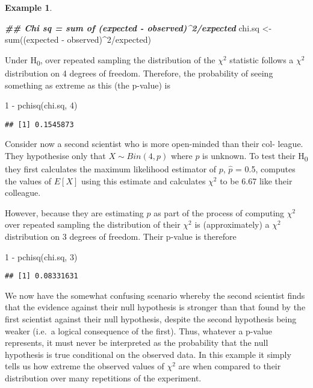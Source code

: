 \documentclass[
]{book}
\newenvironment{Shaded}{\begin{snugshade}}{\end{snugshade}}
\newcommand{\DecValTok}[1]{\textcolor[rgb]{0.00,0.00,0.81}{#1}}
\newcommand{\DocumentationTok}[1]{\textcolor[rgb]{0.56,0.35,0.01}{\textbf{\textit{#1}}}}
\newcommand{\FunctionTok}[1]{\textcolor[rgb]{0.00,0.00,0.00}{#1}}
\newcommand{\NormalTok}[1]{#1}
\newcommand{\OtherTok}[1]{\textcolor[rgb]{0.56,0.35,0.01}{#1}}
\newcommand{\SpecialCharTok}[1]{\textcolor[rgb]{0.00,0.00,0.00}{#1}}
\theoremstyle{definition}
\theoremstyle{definition}
\newtheorem{example}{Example}[chapter]
\theoremstyle{definition}
\theoremstyle{definition}
\theoremstyle{remark}
\begin{document}
\begin{example}
\begin{Shaded}
\begin{Highlighting}[]
\DocumentationTok{\#\# Chi sq = sum of (expected {-} observed)\^{}2/expected}
\NormalTok{chi.sq }\OtherTok{\textless{}{-}} \FunctionTok{sum}\NormalTok{((expected }\SpecialCharTok{{-}}\NormalTok{ observed)}\SpecialCharTok{\^{}}\DecValTok{2}\SpecialCharTok{/}\NormalTok{expected)}
\end{Highlighting}
\end{Shaded}

Under H\textsubscript{0}, over repeated sampling the distribution of the \(\chi^2\) statistic follows a \(\chi^2\) distribution on 4 degrees of freedom. Therefore, the probability of seeing something as extreme as this (the p-value) is

\begin{Shaded}
\begin{Highlighting}[]
\DecValTok{1} \SpecialCharTok{{-}} \FunctionTok{pchisq}\NormalTok{(chi.sq, }\DecValTok{4}\NormalTok{)}
\end{Highlighting}
\end{Shaded}

\begin{verbatim}
## [1] 0.1545873
\end{verbatim}

Consider now a second scientist who is more open-minded than their col- league. They hypothesise only that \(X \sim Bin(4, p)\) where \(p\) is unknown. To test their H\textsubscript{0} they first calculates the maximum likelihood estimator of \(p\), \(\hat{p}\) = 0.5, computes the values of \(E[X]\) using this estimate and calculates \(\chi^2\) to be 6.67 like their colleague.

However, because they are estimating \(p\) as part of the process of computing \(\chi^2\) over repeated sampling the distribution of their \(\chi^2\) is (approximately) a \(\chi^2\) distribution on 3 degrees of freedom. Their p-value is therefore

\begin{Shaded}
\begin{Highlighting}[]
\DecValTok{1} \SpecialCharTok{{-}} \FunctionTok{pchisq}\NormalTok{(chi.sq, }\DecValTok{3}\NormalTok{)}
\end{Highlighting}
\end{Shaded}

\begin{verbatim}
## [1] 0.08331631
\end{verbatim}

We now have the somewhat confusing scenario whereby the second scientist finds that the evidence against their null hypothesis is stronger than that found by the first scientist against their null hypothesis, despite the second hypothesis being weaker (i.e.~a logical consequence of the first). Thus, whatever a p-value represents, it must never be interpreted as the probability that the null hypothesis is true conditional on the observed data. In this example it simply tells us how extreme the observed values of \(\chi^2\) are when compared to their distribution over many repetitions of the experiment.
\end{example}
\end{document}
